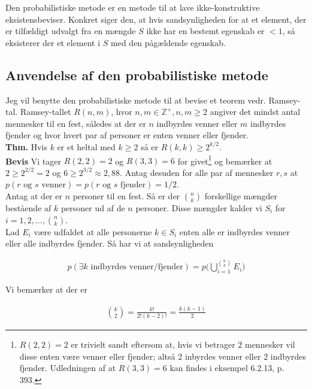 \documentclass[12pt]{article}
\newcommand{\Z}{\mathbb{Z}}
\begin{document}
Den probabilistiske metode er en metode til at lave ikke-konstruktive eksistensbeviser. Konkret siger den, at hvis sandsynligheden for at et element, der er tilfældigt udvalgt fra en mængde $S$ ikke har en bestemt egenskab er $<1$, så eksisterer der et element i $S$ med den pågældende egenskab. 

\subsection*{Anvendelse af den probabilistiske metode}

Jeg vil benytte den probabilistiske metode til at bevise et teorem vedr. Ramsey-tal. Ramsey-tallet $R(n,m)$, hvor $n,m \in \Z^+, n,m \ge 2$ angiver det mindst antal mennesker til en fest, således at der er $n$ indbyrdes venner eller $m$ indbyrdes fjender og hvor hvert par af personer er enten venner eller fjender.  \\

\textbf{Thm.} Hvis $k$ er et heltal med $k \ge 2$ så er $R(k,k) \ge 2^{k/2}$. \\

\textbf{Bevis} Vi tager $R(2,2)=2$ og $R(3,3)=6$ for givet\footnote{$R(2,2)=2$ er trivielt sandt eftersom at, hvis vi betrager $2$ mennesker vil disse enten være venner eller fjender; altså 2 inbyrdes venner eller 2 indbyrdes fjender. Udledningen af at $R(3,3)=6$ kan findes i eksempel 6.2.13, p. 393.} og bemærker at $2 \ge 2^{2/2}=2$ og $6 \ge 2^{3/2} \approx 2,88$. Antag desuden for alle par af mennesker $r,s$ at $p(r \text{ og } s \text{ venner})=p(r \text{ og } s \text{ fjender})=1/2$. \\

Antag at der er $n$ personer til en fest. Så er der $\binom{n}{k}$ forskellige mængder bestående af $k$ personer ud af de $n$ personer. Disse mængder kalder vi $S_i$ for $i=1,2,\ldots, \binom{n}{k}$. \\

Lad $E_i$ være udfaldet at alle personerne $k \in S_i$ enten alle er indbyrdes venner eller alle indbyrdes fjender. Så har vi at sandsynligheden 

\begin{align*}
    p(\exists k \text{ indbyrdes venner/fjender}) = p\bigg( \bigcup_{i=1}^{\binom{n}{k}} E_i \bigg)
\end{align*}

Vi bemærker at der er 

\begin{align*}
    \binom{k}{2} = \frac{k!}{2!(k-2)!} = \frac{k(k-1)}{2}
\end{align*}
\end{document}
